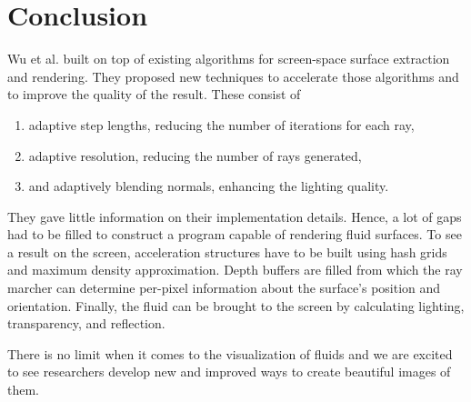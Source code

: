 %
\chapter{Conclusion}
\label{sec:conclusion}

Wu et al. built on top of existing algorithms for screen-space surface extraction and rendering. They proposed new techniques to accelerate those algorithms and to improve the quality of the result.
These consist of
\begin{enumerate}
    \item adaptive step lengths, reducing the number of iterations for each ray,
    \item adaptive resolution, reducing the number of rays generated,
    \item and adaptively blending normals, enhancing the lighting quality.
\end{enumerate}

They gave little information on their implementation details. Hence, a lot of gaps had to be filled to construct a program capable of rendering fluid surfaces. To see a result on the screen, acceleration structures have to be built using hash grids and maximum density approximation. Depth buffers are filled from which the ray marcher can determine per-pixel information about the surface's position and orientation. Finally, the fluid can be brought to the screen by calculating lighting, transparency, and reflection.

There is no limit when it comes to the visualization of fluids and we are excited to see researchers develop new and improved ways to create beautiful images of them.
